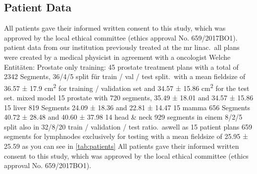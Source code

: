 \subsection{Patient Data}
All patients gave their informed written consent to this study, which was approved by the local ethical committee (ethics approval No. 659/2017BO1).
patient data from our institution previously treated at the mr linac.\ all plans were created by a medical physicist in agreement with a oncologist
Welche Entitäten: Prostate only training: 45 prostate treatment plans with a total of 2342 Segments, 36/4/5 split für train / val / test split.\ with a mean fieldsize of 36.57 ± 17.9 cm\textsuperscript{2} for training / validation set and 34.57 ± 15.86 cm\textsuperscript{2} for the test set.
mixed model 15 prostate with 720 segments, 35.49 ± 18.01 and 34.57 ± 15.86 15 liver 819 Segments 24.09 ± 18.36 and 22.81 ± 14.47 15 mamma 656 Segments 40.72 ± 28.48 and 40.60 ± 37.98 14 head \& neck 929 segments in einem 8/2/5 split also in 32/8/20 train / validation / test ratio.\ aswell as 15 patient plans 659 segments for lymphnodes exclusively for testing with a mean fieldsize of 25.95 ± 25.59
as you can see in \autoref{tab:patients}
All patients gave their informed written consent to this study, which was approved by the local ethical committee (ethics approval No. 659/2017BO1).


